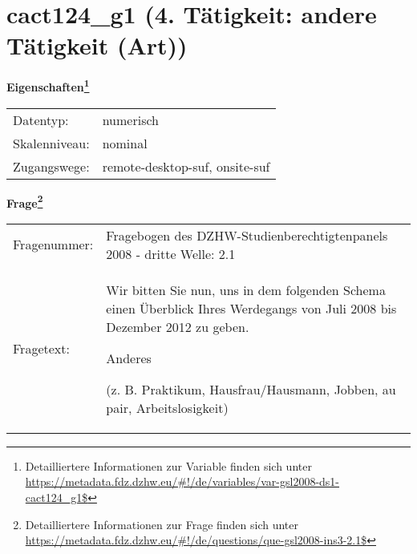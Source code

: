 
    \setcounter{footnote}{0}

    \vspace*{-1.8cm}
	\section{cact124\_g1 (4. Tätigkeit: andere Tätigkeit (Art))}
	\label{section:cact124_g1}



    \vspace*{0.5cm}
    \noindent\textbf{Eigenschaften\footnote{Detailliertere Informationen zur Variable finden sich unter
		\url{https://metadata.fdz.dzhw.eu/\#!/de/variables/var-gsl2008-ds1-cact124_g1$}}}\\
	\begin{tabularx}{\hsize}{@{}lX}
	Datentyp: & numerisch \\
	Skalenniveau: & nominal \\
	Zugangswege: &
	  remote-desktop-suf, 
	  onsite-suf
 \\
    \end{tabularx}



				\vspace*{0.5cm}
                \noindent\textbf{Frage\footnote{Detailliertere Informationen zur Frage finden sich unter
		              \url{https://metadata.fdz.dzhw.eu/\#!/de/questions/que-gsl2008-ins3-2.1$}}}\\
				\begin{tabularx}{\hsize}{@{}lX}
					Fragenummer: &
					  Fragebogen des DZHW-Studienberechtigtenpanels 2008 - dritte Welle:
					  2.1
 \\
					Fragetext: & Wir bitten Sie nun, uns in dem folgenden Schema einen Überblick Ihres Werdegangs von Juli 2008 bis Dezember 2012 zu geben.\par  Anderes\par  (z. B. Praktikum, Hausfrau/Hausmann, Jobben, au pair, Arbeitslosigkeit) \\
				\end{tabularx}





